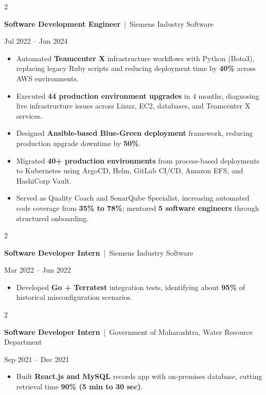 \documentclass[10pt, letterpaper]{article}
\newenvironment{highlights}{
    \begin{itemize}[
        topsep=0.10 cm,
        parsep=0.06 cm,
        partopsep=0pt,
        itemsep=0.06 cm,
        leftmargin=12pt
    ]
}{
    \end{itemize}
}
\newenvironment{twocolentry}[2][]{
    \onecolentry
    \def\secondColumn{#2}
    \setcolumnwidth{\fill, 4.5 cm}
    \begin{paracol}{2}
}{
    \switchcolumn \raggedleft \secondColumn
    \end{paracol}
    \endonecolentry
}
\begin{document}
\vspace{0.15 cm}

\begin{twocolentry}{Jul 2022 -- Jun 2024}
\textbf{Software Development Engineer} \,|\, Siemens Industry Software
\end{twocolentry}
\begin{highlights}
  \item Automated \textbf{Teamcenter X} infrastructure workflows with Python (Boto3), replacing legacy Ruby scripts and reducing deployment time by \textbf{40\%} across AWS environments.
  \item Executed \textbf{44 production environment upgrades} in 4 months, diagnosing live infrastructure issues across Linux, EC2, databases, and Teamcenter X services.
  \item Designed \textbf{Ansible-based Blue-Green deployment} framework, reducing production upgrade downtime by \textbf{50\%}.
  \item Migrated \textbf{40+ production environments} from process-based deployments to Kubernetes using ArgoCD, Helm, GitLab CI/CD, Amazon EFS, and HashiCorp Vault.
  \item Served as Quality Coach and SonarQube Specialist, increasing automated code coverage from \textbf{35\% to 78\%}; mentored \textbf{5 software engineers} through structured onboarding.
\end{highlights}

\vspace{0.15 cm}

\begin{twocolentry}{Mar 2022 -- Jun 2022}
\textbf{Software Developer Intern} \,|\, Siemens Industry Software
\end{twocolentry}
\begin{highlights}
  \item Developed \textbf{Go + Terratest} integration tests, identifying about \textbf{95\%} of historical misconfiguration scenarios.
\end{highlights}

\vspace{0.15 cm}

\begin{twocolentry}{Sep 2021 -- Dec 2021}
\textbf{Software Developer Intern} \,|\, Government of Maharashtra, Water Resource Department
\end{twocolentry}
\begin{highlights}
  \item Built \textbf{React.js and MySQL} records app with on-premises database, cutting retrieval time \textbf{90\% (5 min to 30 sec)}.
\end{highlights}
\end{document}

